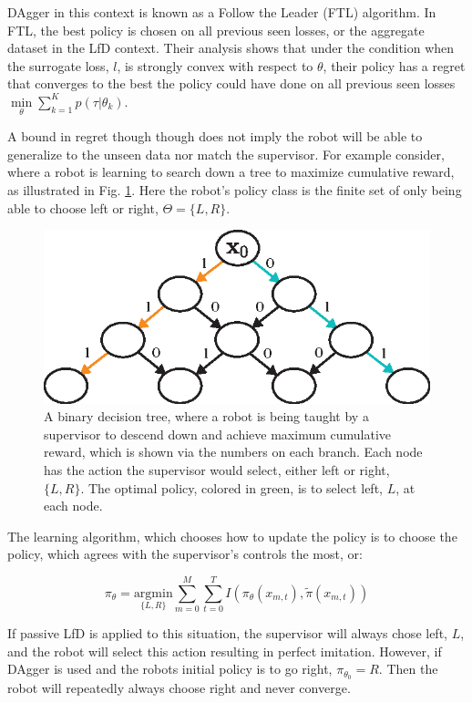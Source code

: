 \documentclass[10pt, conference]{ieeeconf}      %
\begin{document}
DAgger in this context is known as a Follow the Leader (FTL) algorithm. In FTL, the best policy is chosen on all previous seen losses, or the aggregate dataset in the LfD context. Their analysis shows that under the condition when the surrogate loss, $l$, is strongly convex with respect to $\theta$, their policy has a regret that converges to the best the policy could have done on all previous seen losses $\underset{\theta}{\min} \sum_{k=1}^K p(\tau|\theta_k)$. 

A bound in regret though though does not imply the robot will be able to generalize to the unseen data nor match the supervisor. For example consider, where a robot is learning to search down a tree to maximize cumulative reward, as illustrated in Fig. \ref{fig:c_ex}. Here the robot's policy class is the finite set of only being able to choose left or right, $\Theta = \lbrace L,R \rbrace$.

\begin{figure}
\centering
\includegraphics{f_figs/counter_exmp.eps}
\caption{
    \footnotesize
A binary decision tree, where a robot is being taught by a supervisor to descend down and achieve maximum cumulative reward, which is shown via the numbers on each branch. Each node has the action the supervisor would select, either left or right, $\lbrace L, R \rbrace$. The optimal policy, colored in green, is to select left, $L$, at each node.}
\vspace*{-20pt}
\label{fig:c_ex}
\end{figure}

The learning algorithm, which chooses how to update the policy is to choose the policy, which agrees with the supervisor's controls the most, or: 

$$\pi_{\theta} = \underset{\lbrace L,R \rbrace}{\mbox{argmin}} \sum^M_{m=0}\sum^T_{t=0} I(\pi_\theta(x_{m,t}),\tilde{\pi}(x_{m,t}))$$

If passive LfD is applied to this situation, the supervisor will always chose left, $L$, and the robot will select this action resulting in perfect imitation. However, if DAgger is used and the robots initial policy is to go right, $\pi_{\theta_0} = R$. Then the robot will repeatedly always choose right and never converge. 
\end{document}
